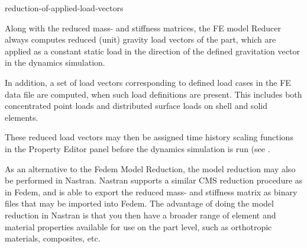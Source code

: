 {



           {reduction-of-applied-load-vectors}

Along with the reduced mass- and stiffness matrices, the FE model
Reducer always computes reduced (unit) gravity load vectors of the part,
which are applied as a constant static load in the direction of the
defined gravitation vector in the dynamics simulation.

In addition, a set of load vectors corresponding to defined load cases
in the FE data file are computed, when such load definitions are present.
This includes both concentrated point loads and distributed surface loads
on shell and solid elements.

These reduced load vectors may then be assigned time history scaling functions
in the Property Editor panel before the dynamics simulation is run
(see .



As an alternative to the Fedem Model Reduction, the model reduction may
also be performed in Nastran. Nastran supports a similar CMS reduction
procedure as in Fedem, and is able to export the reduced mass- and
stiffness matrix as binary files that may be imported into Fedem. The
advantage of doing the model reduction in Nastran is that you then have
a broader range of element and material properties available for use on
the part level, such as orthotropic materials, composites, etc.



}
